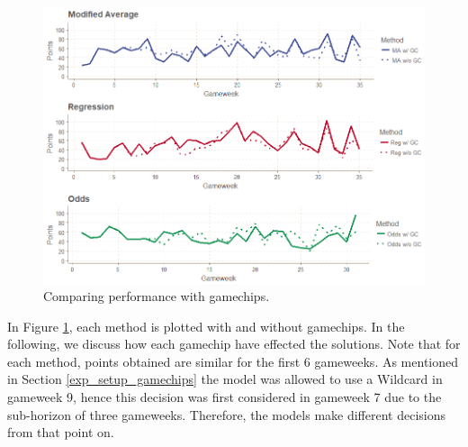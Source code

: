 \begin{figure}[H]
    \centering
    \includegraphics[scale=0.5]{fig/chapter_7/w_wo_gc_all.png}
    \caption{Comparing performance with gamechips.}
\label{fig:res_comp_gamechips}    
\end{figure}

In Figure \ref{fig:res_comp_gamechips}, each method is plotted with and without gamechips. In the following, we discuss how each gamechip have effected the solutions. Note that for each method, points obtained are similar for the first 6 gameweeks. As mentioned in Section \ref{exp_setup_gamechips} the model was allowed to use a Wildcard in gameweek 9, hence this decision was first considered in gameweek 7 due to the sub-horizon of three gameweeks. Therefore, the models make different decisions from that point on.

